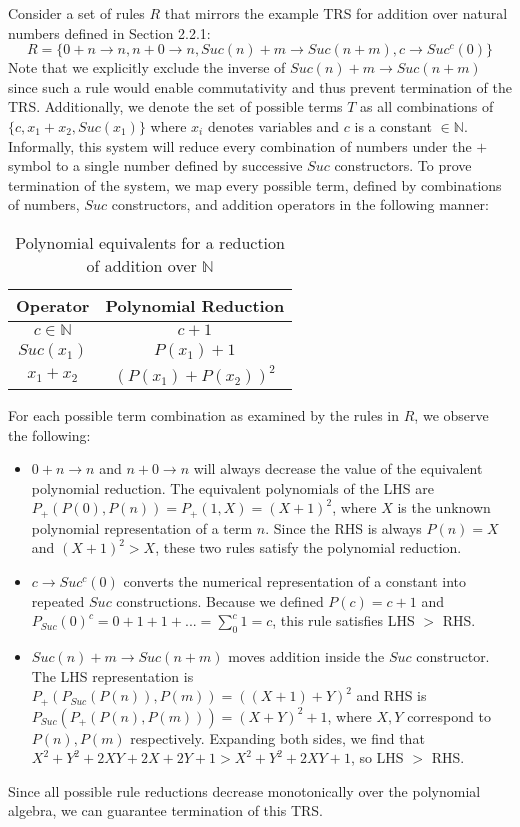 \documentclass{article}
\begin{document}
Consider a set of rules $R$ that mirrors the example TRS for addition over natural numbers defined in Section 2.2.1:
\[R = \{0 + n \rightarrow n, n + 0 \rightarrow n, Suc(n) + m \rightarrow Suc(n+m), c \rightarrow Suc^c(0)\}\]
Note that we explicitly exclude the inverse of $Suc(n) + m \rightarrow Suc(n+m)$
since such a rule would enable commutativity and thus prevent termination of the TRS.
Additionally, we denote the set of possible terms $T$ as all combinations of $\{c, x_1 + x_2, Suc(x_1)\}$ where $x_i$ denotes variables and $c$ is a constant $\in \mathbb{N}$.
Informally, this system will reduce every combination of numbers under the $+$ symbol to a single number defined by successive $Suc$ constructors.
To prove termination of the system, we map every possible term, defined by combinations of numbers, $Suc$ constructors, and addition operators
in the following manner:
\begin{table}[H]
    \centering\begin{tabular}{|c|c|}
        \hline
        Operator & Polynomial Reduction\\
        \hline
        $c \in \mathbb{N}$ & $c + 1$\\
        $Suc(x_1)$ & $P(x_1) + 1$\\
        $x_1 + x_2$ & $(P(x_1) + P(x_2))^2$\\
        \hline
    \end{tabular}
    \caption{Polynomial equivalents for a reduction of addition over $\mathbb{N}$}
    \label{<label>}
\end{table}
For each possible term combination as examined by the rules in $R$, we observe the following:
\begin{itemize}
    \item $0 + n \rightarrow n$ and $n + 0 \rightarrow n$ will always decrease the value of the equivalent polynomial reduction.
    The equivalent polynomials of the LHS are $P_+(P(0),P(n)) = P_+(1, X) = (X+1)^2$, where $X$ is the unknown polynomial representation of a term $n$.
    Since the RHS is always $P(n) = X$ and $(X+1)^2 > X$, these two rules satisfy the polynomial reduction.
    \item $c \rightarrow Suc^c(0)$ converts the numerical representation of a constant into repeated $Suc$ constructions.
    Because we defined $P(c) = c+1$ and $P_{Suc}(0)^c = 0 + 1 + 1 + ... = \sum_0^c 1 = c$, this rule satisfies LHS $>$ RHS.
    \item $Suc(n) + m \rightarrow Suc(n+m)$ moves addition inside the $Suc$ constructor. The LHS representation is $P_+(P_{Suc}(P(n)),P(m))=((X+1)+Y)^2$
    and RHS is $P_{Suc}(P_+(P(n),P(m)))=(X+Y)^2+1$, where $X,Y$ correspond to $P(n), P(m)$ respectively.
    Expanding both sides, we find that $X^2+Y^2+2XY+2X+2Y+1 > X^2+Y^2+2XY+1$, so LHS $>$ RHS.
\end{itemize}
Since all possible rule reductions decrease monotonically over the polynomial algebra, we can guarantee termination of this TRS.
\end{document}
